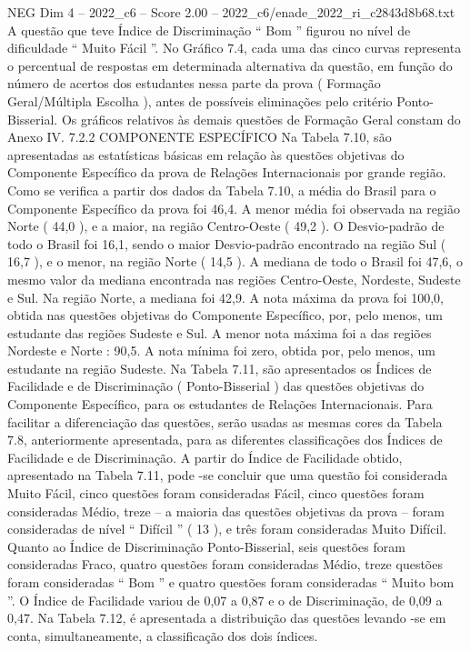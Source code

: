 \begin{textsample}{NEG Dim 4 – 2022\_c6 – Score 2.00 – 2022\_c6/enade\_2022\_ri\_c2843d8b68.txt}
A questão que teve Índice de Discriminação “ Bom ” figurou no nível de dificuldade “ Muito Fácil ”.
No Gráfico 7.4, cada uma das cinco curvas representa o percentual de respostas em determinada alternativa da questão, em função do número de acertos dos estudantes nessa parte da prova ( Formação Geral/Múltipla Escolha ), antes de possíveis eliminações pelo critério Ponto-Bisserial.
Os gráficos relativos às demais questões de Formação Geral constam do Anexo IV. 7.2.2 COMPONENTE ESPECÍFICO Na Tabela 7.10, são apresentadas as estatísticas básicas em relação às questões objetivas do Componente Específico da prova de Relações Internacionais por grande região.
Como se verifica a partir dos dados da Tabela 7.10, a média do Brasil para o Componente Específico da prova foi 46,4.
A menor média foi observada na região Norte ( 44,0 ), e a maior, na região Centro-Oeste ( 49,2 ).
O Desvio-padrão de todo o Brasil foi 16,1, sendo o maior Desvio-padrão encontrado na região Sul ( 16,7 ), e o menor, na região Norte ( 14,5 ).
A mediana de todo o Brasil foi 47,6, o mesmo valor da mediana encontrada nas regiões Centro-Oeste, Nordeste, Sudeste e Sul.
Na região Norte, a mediana foi 42,9.
A nota máxima da prova foi 100,0, obtida nas questões objetivas do Componente Específico, por, pelo menos, um estudante das regiões Sudeste e Sul.
A menor nota máxima foi a das regiões Nordeste e Norte : 90,5.
A nota mínima foi zero, obtida por, pelo menos, um estudante na região Sudeste.
Na Tabela 7.11, são apresentados os Índices de Facilidade e de Discriminação ( Ponto-Bisserial ) das questões objetivas do Componente Específico, para os estudantes de Relações Internacionais.
Para facilitar a diferenciação das questões, serão usadas as mesmas cores da Tabela 7.8, anteriormente apresentada, para as diferentes classificações dos Índices de Facilidade e de Discriminação.
A partir do Índice de Facilidade obtido, apresentado na Tabela 7.11, pode -se concluir que uma questão foi considerada Muito Fácil, cinco questões foram consideradas Fácil, cinco questões foram consideradas Médio, treze – a maioria das questões objetivas da prova – foram consideradas de nível “ Difícil ” ( 13 ), e três foram consideradas Muito Difícil.
Quanto ao Índice de Discriminação Ponto-Bisserial, seis questões foram consideradas Fraco, quatro questões foram consideradas Médio, treze questões foram consideradas “ Bom ” e quatro questões foram consideradas “ Muito bom ”.
O Índice de Facilidade variou de 0,07 a 0,87 e o de Discriminação, de 0,09 a 0,47.
Na Tabela 7.12, é apresentada a distribuição das questões levando -se em conta, simultaneamente, a classificação dos dois índices.

\end{textsample}
